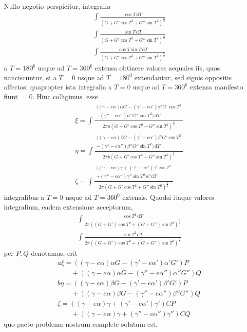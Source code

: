 Nullo negotio perspicitur, integralia
\[
\begin{aligned}
&\int\frac{\cos T\,\mathrm dT}{(G+G'\cos T^2+G''\sin T^2)^{\frac32}}\\[8pt]
&\int\frac{\sin T\,\mathrm dT}{(G+G'\cos T^2+G''\sin T^2)^{\frac32}}\\[8pt]
&\int\frac{\cos T\sin T\,\mathrm dT}{(G+G'\cos T^2+G''\sin T^2)^{\frac32}}
\end{aligned}
\]
a $T=180^0$ usque ad $T=360^0$ extensa obtinere valores aequales iis, quos nanciscuntur,
si a $T=0$ usque ad $T=180^0$ extendantur, sed signis oppositis affectos;
quapropter ista integralia a $T=0$ usque ad $T=360^0$ extensa manifesto fiunt $=0$.
Hinc colligimus. esse
\[
\begin{aligned}
&\xi{}=\int\frac{\begin{gathered}((\gamma-e\alpha)\alpha G-(\gamma'-e\alpha')\alpha'G'\cos T^2\\-(\gamma''-e\alpha'')\alpha''G''\sin T^2)\,\mathrm dT\end{gathered}}{2\pi a(G+G'\cos T^2+G''\sin T^2)^{\frac32}}\\[8pt]
&\eta{}=\int\frac{\begin{gathered}((\gamma-e\alpha)\beta G-(\gamma'-e\alpha')\beta'G'\cos T^2\\-(\gamma''-e\alpha'')\beta''G''\sin T^2)\,\mathrm dT\end{gathered}}{2\pi b(G+G'\cos T^2+G''\sin T^2)^{\frac32}}\\[8pt]
&\zeta{}=\int\frac{\begin{gathered}((\gamma-e\alpha)\gamma+(\gamma'-e\alpha')\gamma'\cos T^2\\+(\gamma''-e\alpha'')\gamma''\sin T^2)C\,\mathrm dT\end{gathered}}{2\pi(G+G'\cos T^2+G''\sin T^2)^{\frac32}}
\end{aligned}
\]
integralibus a $T=0$ usque ad $T=360^0$ extensis.
Quodsi itaque valores integralium, eadem extensione acceptorum,
\[
\begin{aligned}
&\int\frac{\cos T^2\,\mathrm dT}{2\pi((G+G')\cos T^2+(G+G'')\sin T^2)^{\frac32}}\\[8pt]
&\int\frac{\sin T^2\,\mathrm dT}{2\pi((G+G')\cos T^2+(G+G'')\sin T^2)^{\frac32}}
\end{aligned}
\]
per $P,Q$ denotamus, erit
\[
\begin{aligned}
&a\xi=((\gamma-e\alpha)\alpha G-(\gamma'-e\alpha')\alpha'G')P\\[6pt]
&\qquad{}+((\gamma-e\alpha)\alpha G-(\gamma''-e\alpha'')\alpha''G'')Q\\[8pt]
&b\eta=((\gamma-e\alpha)\beta G-(\gamma'-e\alpha')\beta'G')P\\[6pt]
&\qquad{}+((\gamma-e\alpha)\beta G-(\gamma''-e\alpha'')\beta''G'')Q\\[8pt]
&\zeta=((\gamma-e\alpha)\gamma+(\gamma'-e\alpha')\gamma')CP\\[6pt]
&\qquad{}+((\gamma-e\alpha)\gamma+(\gamma''-e\alpha'')\gamma'')CQ
\end{aligned}
\]
quo pacto problema nostrum complete solutum est.

